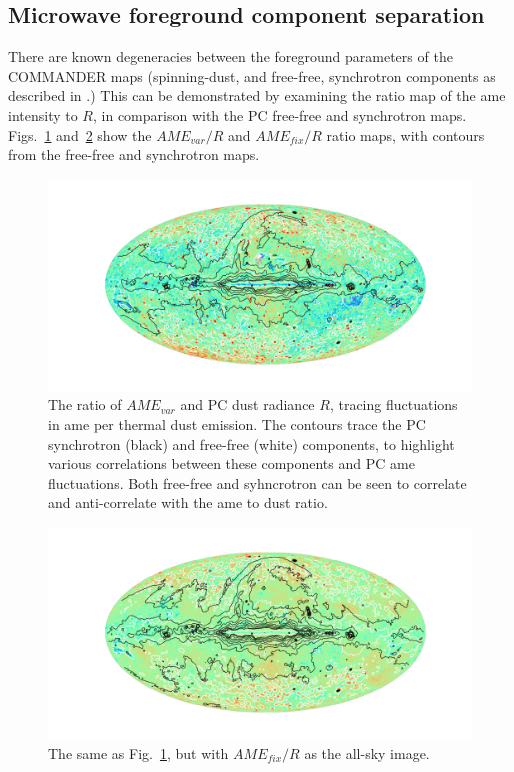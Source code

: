           \subsection{Microwave foreground component separation}
            There are known degeneracies between the foreground parameters of the COMMANDER maps (spinning-dust, and free-free, synchrotron components as described in \cite{planck15X}.) This can be demonstrated by examining the ratio map of the \acrshort{ame} intensity to $R$, in comparison with the PC free-free and synchrotron maps. Figs.~\ref{fig:AMEvartoDust_ffandSyncCountours} and~\ref{fig:AMEfixtoDust_ffandSyncCountours} show the $AME_{var}/R$ and $AME_{fix}/R$ ratio maps, with contours from the free-free and synchrotron maps.
                \begin{figure}
                    \includegraphics[width=\textwidth,trim={6cm 2cm 5.0cm 2cm},clip]{../Plots/ch_allsky/AMEvartoDust_ffandSyncCountours.pdf}
                    \centering
                    \caption{The ratio of $AME_{var}$ and PC dust radiance $R$, tracing fluctuations in \acrshort{ame} per thermal dust emission. The contours trace the PC synchrotron (black) and free-free (white) components, to highlight various correlations between these components and PC \acrshort{ame} fluctuations. Both free-free and syhncrotron can be seen to correlate and anti-correlate with the \acrshort{ame} to dust ratio.}
                    \label{fig:AMEvartoDust_ffandSyncCountours}
                \end{figure}
                \begin{figure}
                    \includegraphics[width=\textwidth,trim={6cm 2cm 5.0cm 2cm},clip]{../Plots/ch_allsky/AMEfixtoDust_ffandSyncCountours.pdf}
                    \centering
                    \caption{The same as Fig.~\ref{fig:AMEvartoDust_ffandSyncCountours}, but with $AME_{fix}/R$ as the all-sky image.}
                    \label{fig:AMEfixtoDust_ffandSyncCountours}
                \end{figure}

